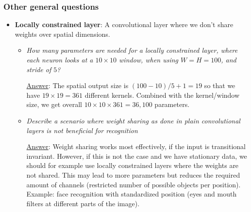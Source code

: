\subsubsection{Other general questions}
\begin{itemize}
	\item \textbf{Locally constrained layer}: A convolutional layer where we don't share weights over spatial dimensions.
	\begin{itemize}
		\item \textit{How many parameters are needed for a locally constrained layer, where each neuron looks at a $10\times10$ window, when using $W=H=100$, and stride of $5$?}
		
		\underline{Answer}: The spatial output size is $(100 - 10) / 5 + 1 = 19$ so that we have $19\times 19=361$ different kernels. Combined with the kernel/window size, we get overall $10\times 10\times 361=36,100$ parameters.
		\item \textit{Describe a scenario where weight sharing as done in plain convolutional layers is not beneficial for recognition}
		
		\underline{Answer}: Weight sharing works most effectively, if the input is transitional invariant. However, if this is not the case and we have stationary data, we should for example use locally constrained layers where the weights are not shared. This may lead to more parameters but reduces the required amount of channels (restricted number of possible objects per position). Example: face recognition with standardized position (eyes and mouth filters at different parts of the image). 
	\end{itemize}
\end{itemize}
